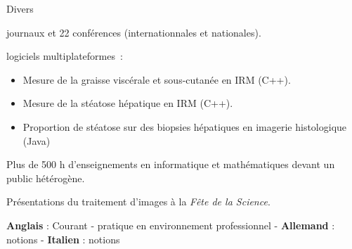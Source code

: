 \vspace{-.5cm}
\begin{rubric}{Divers}

   journaux et 22 conférences
  (internationnales et nationales).

   logiciels multiplateformes~: 
  \begin{itemize}
  \item Mesure de la graisse viscérale et sous-cutanée en IRM (C++).
  \item Mesure de la stéatose hépatique en IRM (C++).
  \item Proportion de stéatose sur des biopsies hépatiques en imagerie
    histologique (Java)
  \end{itemize}

  \entry*[Transmission]  Plus de 500 h d'enseignements en informatique et
  mathématiques devant un public hétérogène. 

  \entry*[Vulgarisation] Présentations du traitement d'images à la \emph{Fête de la Science}. 
  
   \textbf{Anglais} : Courant - pratique en environnement professionnel - \textbf{Allemand} : notions - \textbf{Italien} : notions
  







\end{rubric}
